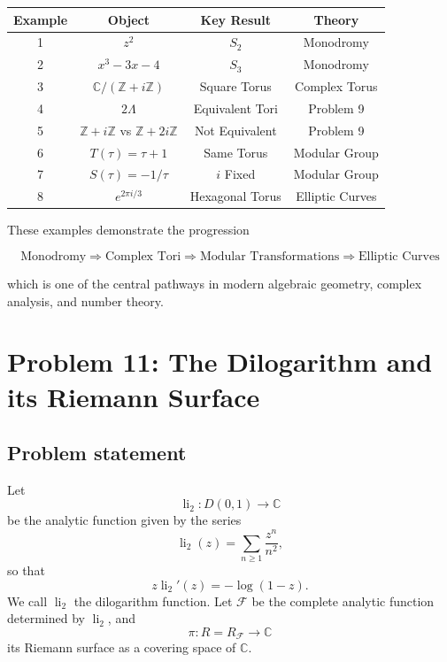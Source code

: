 \documentclass[12pt,a4paper]{article}
\theoremstyle{notespace}
\begin{document}
\begin{center}
	\begin{tabular}{|c|c|c|c|}
		\hline
		Example &
		Object &
		Key Result &
		Theory
		\\
		\hline
		1 &
		\(z^2\) &
		\(S_2\) &
		Monodromy
		\\
		\hline
		2 &
		\(x^3-3x-4\) &
		\(S_3\) &
		Monodromy
		\\
		\hline
		3 &
		\(\mathbb C/(\mathbb Z+i\mathbb Z)\) &
		Square Torus &
		Complex Torus
		\\
		\hline
		4 &
		\(2\Lambda\) &
		Equivalent Tori &
		Problem 9
		\\
		\hline
		5 &
		\(\mathbb Z+i\mathbb Z\) vs
		\(\mathbb Z+2i\mathbb Z\) &
		Not Equivalent &
		Problem 9
		\\
		\hline
		6 &
		\(T(\tau)=\tau+1\) &
		Same Torus &
		Modular Group
		\\
		\hline
		7 &
		\(S(\tau)=-1/\tau\) &
		\(i\) Fixed &
		Modular Group
		\\
		\hline
		8 &
		\(e^{2\pi i/3}\) &
		Hexagonal Torus &
		Elliptic Curves
		\\
		\hline
	\end{tabular}
\end{center}

These examples demonstrate the progression

\[
\boxed{
	\text{Monodromy}
}
\Longrightarrow
\boxed{
	\text{Complex Tori}
}
\Longrightarrow
\boxed{
	\text{Modular Transformations}
}
\Longrightarrow
\boxed{
	\text{Elliptic Curves}
}
\]

which is one of the central pathways in modern algebraic geometry,
complex analysis, and number theory.

\section{Problem 11: The Dilogarithm and its Riemann Surface}

\subsection*{Problem statement}

Let
\[
\operatorname{li}_2:D(0,1)\to \mathbb C
\]
be the analytic function given by the series
\[
\operatorname{li}_2(z)=\sum_{n\geq 1}\frac{z^n}{n^2},
\]
so that
\[
z\operatorname{li}_2'(z)=-\log(1-z).
\]
We call \(\operatorname{li}_2\) the dilogarithm function. Let \(\mathcal F\) be the complete analytic function determined by \(\operatorname{li}_2\), and
\[
\pi:R=R_{\mathcal F}\to \mathbb C
\]
its Riemann surface as a covering space of \(\mathbb C\).
\end{document}
